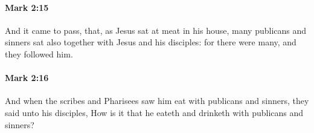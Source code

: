 		\paragraph{Mark 2:15} %
			\label{MARK-2-15}

			And it came to pass, that, as Jesus sat at meat in his house, many publicans and sinners sat also together with Jesus and his disciples: for there were many, and they followed him.

			\begin{framed}
			\scriptsize
				\begin{compactdesc}
					\item[SBLG] 
				\end{compactdesc}
			\end{framed}

		\paragraph{Mark 2:16} %
			\label{MARK-2-16}

			And when the scribes and Pharisees saw him eat with publicans and sinners, they said unto his disciples, How is it that he eateth and drinketh with publicans and sinners?

